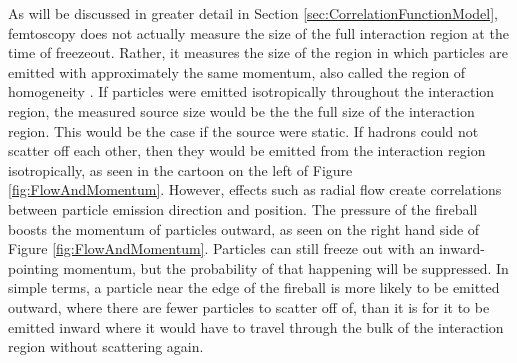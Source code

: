 As will be discussed in greater detail in Section \ref{sec:CorrelationFunctionModel}, femtoscopy does not actually measure the size of the full interaction region at the time of freezeout.
Rather, it measures the size of the region in which particles are emitted with approximately the same momentum, also called the region of homogeneity \cite{Akkelin:1995gh}.
If particles were emitted isotropically throughout the interaction region, the measured source size would be the the full size of the interaction region.
This would be the case if the source were static.
If hadrons could not scatter off each other, then they would be emitted from the interaction region isotropically, as seen in the cartoon on the left of Figure \ref{fig:FlowAndMomentum}.
However, effects such as radial flow create correlations between particle emission direction and position. 
The pressure of the fireball boosts the momentum of particles outward, as seen on the right hand side of Figure \ref{fig:FlowAndMomentum}.
Particles can still freeze out with an inward-pointing momentum, but the probability of that happening will be suppressed.
In simple terms, a particle near the edge of the fireball is more likely to be emitted outward, where there are fewer particles to scatter off of, than it is for it to be emitted inward where it would have to travel through the bulk of the interaction region without scattering again. 


